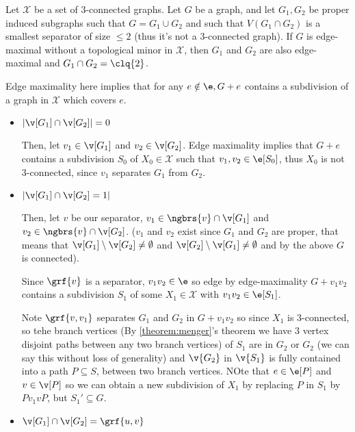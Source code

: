 \begin{customlemma}{4.17}
\label{lemma:4.17}
    Let $\mathcal{X}$ be a set of $3$-connected graphs. Let $G$ be a graph, and let $G_1, G_2$ be proper induced subgraphs such that $G = G_1 \cup G_2$ and such that $V(G_1 \cap G_2)$ is a smallest separator of size $\leq 2$ (thus it's not a $3$-connected graph). If $G$ is edge-maximal without a topological minor in $\mathcal{X}$, then $G_1$ and $G_2$ are also edge-maximal and $G_1 \cap G_2 = \clq{2}$.
\end{customlemma}
\begin{prf}
    Edge maximality here implies that for any $e \notin \e, G + e$ contains a subdivision of a graph in $\mathcal{X}$ which covers $e$.
    \begin{itemize}
        \item \boldmath$|\v[G_1] \cap \v[G_2]| = 0$\unboldmath
        
        Then, let $v_1 \in \v[G_1]$ and $v_2 \in \v[G_2]$. Edge maximality implies that $G + e$ contains a subdivision $S_0$ of $X_0 \in \mathcal{X}$ such that $v_1, v_2 \in \e[S_0]$, thus $X_0$ is not $3$-connected, since $v_1$ separates $G_1$ from $G_2$.
        \item \boldmath$|\v[G_1] \cap \v[G_2] = 1|$\unboldmath 
        
        Then, let $v$ be our separator, $v_1 \in \ngbrs{v} \cap \v[G_1]$ and $v_2 \in \ngbrs{v} \cap \v[G_2]$. ($v_1$ and $v_2$ exist since $G_1$ and $G_2$ are proper, that means that $\v[G_1] \setminus \v[G_2] \neq \emptyset$ and $\v[G_2] \setminus \v[G_1] \neq \emptyset$ and by the above $G$ is connected).
        
        Since $\grf{v}$ is a separator, $v_1v_2 \in \e$ so edge by edge-maximality $G + v_1v_2$ contains a subdivision $S_1$ of some $X_1 \in \mathcal{X}$ with $v_1v_2 \in \e[S_1]$.

        Note $\grf{v, v_1}$ separates $G_1$ and $G_2$ in $G + v_1v_2$ so since $X_1$ is $3$-connected, so tehe branch vertices (By \ref{theorem:menger}'s theorem we have $3$ vertex disjoint paths between any two branch vertices) of $S_1$ are in $G_2$ or $G_2$ (we can say this without loss of generality) and $\v{G_2}$ in $\v{S_1}$ is fully contained into a path $P \subseteq S$, between two branch vertices. NOte that $e \in \e[P]$ and $v \in \v[P]$ so we can obtain a new subdivision of $X_1$ by replacing $P$ in $S_1$ by $Pv_1vP$, but $S_1' \subseteq G$.
        \item \boldmath$\v[G_1] \cap \v[G_2] = \grf{u, v}$\unboldmath
        

\end{itemize}
\end{prf}
